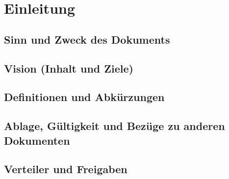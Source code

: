 \section{Einleitung}

\subsection{Sinn und Zweck des Dokuments}

\subsection{Vision (Inhalt und Ziele)}

\subsection{Definitionen und Abkürzungen}

\subsection{Ablage, Gültigkeit und Bezüge zu anderen Dokumenten}

\subsection{Verteiler und Freigaben}